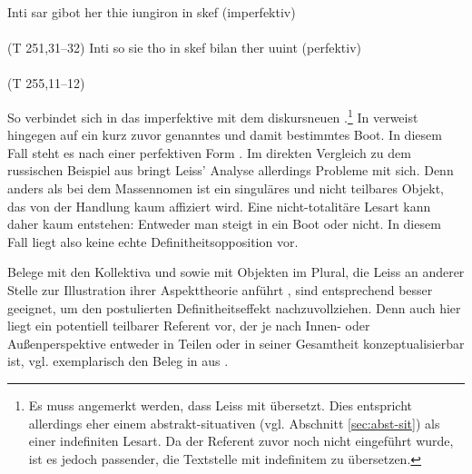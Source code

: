 \begin{exe}
	\ex \label{ex:gi-stigan}   
	\begin{xlist}
		\ex \label{ex:stigan} Inti sar gibot her thie iungiron  in skef  (imperfektiv) \\ 
		 \\ (T 251,31--32)
		\ex \label{ex:gistigan} Inti so sie tho  in skef bilan ther uuint  (perfektiv) \\   \\ (T 255,11--12)
		\end{xlist}
\end{exe}
\noindent
So verbindet sich in  das imperfektive    mit dem diskursneuen .\footnote{Es muss angemerkt werden, dass Leiss  mit  übersetzt. Dies entspricht allerdings eher einem abstrakt-situativen   (vgl. Abschnitt \ref{sec:abst-sit}) als einer indefiniten  Lesart. Da der Referent zuvor noch nicht eingeführt wurde, ist es jedoch passender, die Textstelle mit indefinitem  zu übersetzen.} In  verweist  hingegen auf ein kurz zuvor genanntes und damit bestimmtes Boot. In diesem Fall steht es nach einer perfektiven  Form .
Im direkten Vergleich zu dem russischen Beispiel aus  bringt Leiss' Analyse allerdings Probleme mit sich. Denn anders als bei dem Massennomen   ist  ein singuläres und nicht teilbares Objekt, das von der Handlung  kaum affiziert wird. Eine nicht-totalitäre Lesart kann daher kaum entstehen: Entweder man steigt in ein Boot oder nicht. In diesem Fall liegt also keine echte Definitheitsopposition  vor. 

Belege mit den Kollektiva    und   sowie mit Objekten  im Plural, die Leiss an anderer Stelle zur Illustration ihrer Aspekttheorie  anführt \parencite[170--174]{Leiss2000}, sind entsprechend besser geeignet, um den postulierten Definitheitseffekt  nachzuvollziehen. Denn auch hier liegt ein potentiell teilbarer Referent vor, der je nach Innen- oder Außenperspektive entweder in Teilen oder in seiner Gesamtheit konzeptualisierbar ist, vgl. exemplarisch den Beleg in  aus \textcite[170]{Leiss2000}. 


